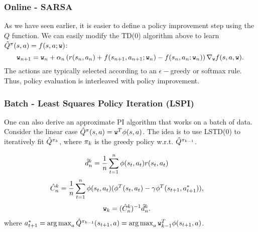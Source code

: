 \subsubsection{Online - SARSA}
As we have seen earlier, it is easier to define a policy improvement step using the $Q$ function. We can easily modify the TD(0) algorithm above to learn $\hat{Q}^\pi(s,a) = f(s,a;\texttt{w})$:
\begin{equation*}
    \texttt{w}_{n+1} = \texttt{w}_n + \alpha_n \left( r(s_n,a_n) + f(s_{n+1},a_{n+1};\texttt{w}_n) - f(s_{n},a_{n}; \texttt{w}_n) \right) \nabla_{\texttt{w}} f(s,a,\texttt{w}).
\end{equation*}
The actions are typically selected according to an $\epsilon-$greedy or softmax rule. Thus, policy evaluation is interleaved with policy improvement.

\subsubsection{Batch - Least Squares Policy Iteration (LSPI)}
One can also derive an approximate PI algorithm that works on a batch of data. Consider the linear case $\hat{Q}^\pi(s,a) = \texttt{w}^T \phi(s,a)$. The idea is to use LSTD(0) to iteratively fit $\hat{Q}^{\pi_k}$, where $\pi_k$ is the greedy policy w.r.t. $\hat{Q}^{\pi_{k-1}}$.

\begin{align*}
\hat{d}_n^k &= \frac{1}{n} \sum_{t=1}^n  {\phi}(s_t, a_t) r(s_t,a_t) 
\end{align*}
\begin{align*}
\hat{C}_n^k &= \frac{1}{n} \sum_{t=1}^n {\phi}(s_t,a_t)( {\phi}^T(s_t,a_t)-\gamma {\phi}^T(s_{t+1},a^*_{t+1})),
\end{align*}
\begin{align*}
\texttt{w}_k &= (\hat{C}_n^k)^{-1} \hat{d}_n^k.
\end{align*}
where $a^*_{t+1} = \argmax_a \hat{Q}^{\policy_{k-1}}(s_{t+1},a) = \argmax_a \weights_{k-1}^T\ftrs(s_{t+1},a)$.

